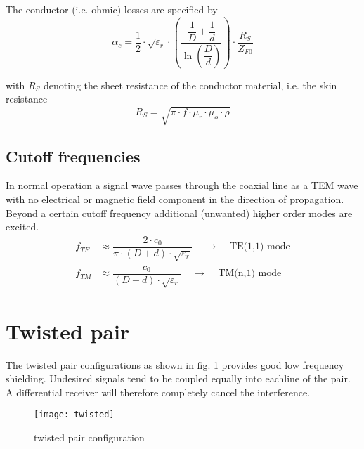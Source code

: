 The conductor (i.e. ohmic) losses are specified by
\begin{equation}
\alpha_c = \dfrac{1}{2}\cdot \sqrt{\varepsilon_r} \cdot\left(\dfrac{\dfrac{1}{D} + \dfrac{1}{d}}{\ln{\left(\dfrac{D}{d}\right)}}\right)\cdot\dfrac{R_S}{Z_{F0}}
\end{equation}

with $R_S$ denoting the sheet resistance of the conductor material,
i.e. the skin resistance
\begin{equation}
R_S = \sqrt{\pi\cdot f\cdot \mu_r \cdot \mu_o \cdot \rho}
\end{equation}

\subsection{Cutoff frequencies}

In normal operation a signal wave passes through the coaxial line as a
TEM wave with no electrical or magnetic field component in the
direction of propagation.  Beyond a certain cutoff frequency
additional (unwanted) higher order modes are excited.
\begin{align}
f_{TE} &\approx \dfrac{2\cdot c_0}{\pi\cdot\left(D + d\right)\cdot\sqrt{\varepsilon_r}}
\;\;\;\;\rightarrow\;\;\;\; \textrm{TE(1,1) mode}\\
f_{TM} &\approx \dfrac{c_0}{\left(D - d\right)\cdot\sqrt{\varepsilon_r}}
\;\;\;\;\rightarrow\;\;\;\; \textrm{TM(n,1) mode}
\end{align}

\section{Twisted pair}

The twisted pair configurations as shown in fig. \ref{fig:twisted}
provides good low frequency shielding.  Undesired signals tend to be
coupled equally into eachline of the pair.  A differential receiver
will therefore completely cancel the interference.

\begin{figure}[ht]
\begin{center}
\texttt{[image: twisted]}
\end{center}
\caption{twisted pair configuration}
\label{fig:twisted}
\end{figure}
\FloatBarrier


